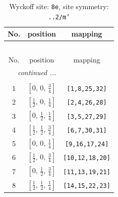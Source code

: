 \documentclass[fleqn,8pt]{jsarticle}
\begin{document}
\renewcommand{\arraystretch}{1.2}
\begin{longtable}{ccc}
\caption{Wyckoff site: {\tt 8e}, site symmetry: {\tt ..2/m'}}
 \\
 \hline \hline
No. & position & mapping \\ \hline \endfirsthead

\multicolumn{2}{l}{\tablename\ \thetable{}} \\
 \hline \hline
No. & position & mapping \\ \hline \endhead

 \hline \hline
\multicolumn{2}{r}{\footnotesize\it continued ...} \\ \endfoot

 \hline \hline
\multicolumn{2}{r}{} \\ \endlastfoot

1 & $\left[ 0,\, 0,\, \frac{3}{4} \right]$ & {\tt [1,8,25,32]} \\ \hline
2 & $\left[ \frac{1}{2},\, 0,\, \frac{1}{4} \right]$ & {\tt [2,4,26,28]} \\ \hline
3 & $\left[ 0,\, \frac{1}{2},\, \frac{1}{4} \right]$ & {\tt [3,5,27,29]} \\ \hline
4 & $\left[ \frac{1}{2},\, \frac{1}{2},\, \frac{3}{4} \right]$ & {\tt [6,7,30,31]} \\ \hline
5 & $\left[ 0,\, 0,\, \frac{1}{4} \right]$ & {\tt [9,16,17,24]} \\ \hline
6 & $\left[ \frac{1}{2},\, 0,\, \frac{3}{4} \right]$ & {\tt [10,12,18,20]} \\ \hline
7 & $\left[ 0,\, \frac{1}{2},\, \frac{3}{4} \right]$ & {\tt [11,13,19,21]} \\ \hline
8 & $\left[ \frac{1}{2},\, \frac{1}{2},\, \frac{1}{4} \right]$ & {\tt [14,15,22,23]} \\
\end{longtable}
\renewcommand{\arraystretch}{1.2}
\end{document}
